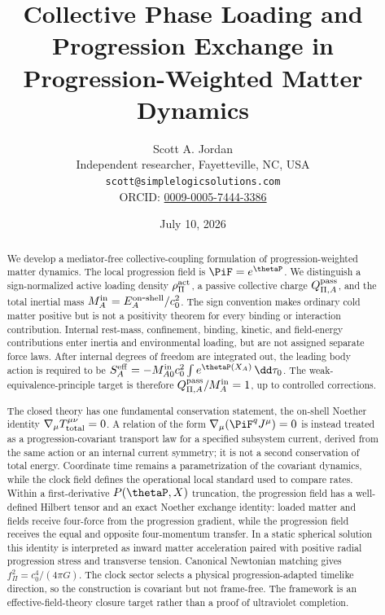 \documentclass[12pt]{article}
\title{Collective Phase Loading and Progression Exchange in Progression-Weighted Matter Dynamics}
\author{Scott A. Jordan\\
Independent researcher, Fayetteville, NC, USA\\
\texttt{scott@simplelogicsolutions.com}\\
ORCID: \href{https://orcid.org/0009-0005-7444-3386}{0009-0005-7444-3386}}
\date{July 10, 2026}
\begin{document}
\maketitle

\begin{abstract}
We develop a mediator-free collective-coupling formulation of progression-weighted matter dynamics.  The local progression field is \(\PiF=e^{\thetaP}\).  We distinguish a sign-normalized active loading density \(\rho_\Pi^{\rm act}\), a passive collective charge \(Q_{\Pi,A}^{\rm pass}\), and the total inertial mass \(M_A^{\rm in}=E_A^{\rm on\mbox{-}shell}/c_0^2\).  The sign convention makes ordinary cold matter positive but is not a positivity theorem for every binding or interaction contribution.  Internal rest-mass, confinement, binding, kinetic, and field-energy contributions enter inertia and environmental loading, but are not assigned separate force laws.  After internal degrees of freedom are integrated out, the leading body action is required to be \(S_A^{\rm eff}=-M_{A0}^{\rm in}c_0^2\int e^{\thetaP(X_A)}\,\dd\tau_0\).  The weak-equivalence-principle target is therefore \(Q_{\Pi,A}^{\rm pass}/M_A^{\rm in}=1\), up to controlled corrections.

The closed theory has one fundamental conservation statement, the on-shell Noether identity \(\nabla_\mu T_{\rm total}^{\mu\nu}=0\).  A relation of the form \(\nabla_\mu(\PiF^q J^\mu)=0\) is instead treated as a progression-covariant transport law for a specified subsystem current, derived from the same action or an internal current symmetry; it is not a second conservation of total energy.  Coordinate time remains a parametrization of the covariant dynamics, while the clock field defines the operational local standard used to compare rates.  Within a first-derivative \(P(\thetaP,X)\) truncation, the progression field has a well-defined Hilbert tensor and an exact Noether exchange identity: loaded matter and fields receive four-force from the progression gradient, while the progression field receives the equal and opposite four-momentum transfer.  In a static spherical solution this identity is interpreted as inward matter acceleration paired with positive radial progression stress and transverse tension.  Canonical Newtonian matching gives \(f_\Pi^2=c_0^4/(4\pi G)\).  The clock sector selects a physical progression-adapted timelike direction, so the construction is covariant but not frame-free.  The framework is an effective-field-theory closure target rather than a proof of ultraviolet completion.
\end{abstract}
\end{document}
